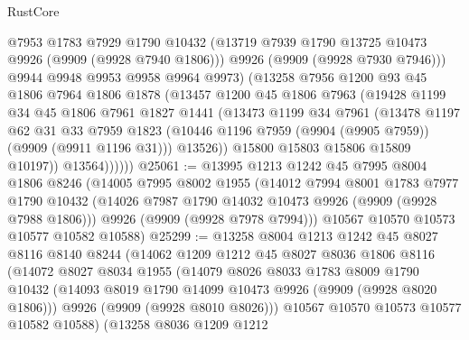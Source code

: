 \begin{lexlean}{RustCore}
\begin{coremodule}
                  @7953
                  @1783
                  @7929
                  @1790
                  @10432
                  (@13719 @7939 @1790 @13725 @10473 @9926 (@9909 (@9928 @7940 @1806)))
                  @9926
                  (@9909 (@9928 @7930 @7946)))
                @9944
                @9948
                @9953
                @9958
                @9964
                @9973)
              (@13258
                @7956
                @1200
                @93
                @45
                @1806
                @7964
                @1806
                @1878
                (@13457
                  @1200
                  @45
                  @1806
                  @7963
                  (@19428
                    @1199
                    @34
                    @45
                    @1806
                    @7961
                    @1827
                    @1441
                    (@13473
                      @1199
                      @34
                      @7961
                      (@13478
                        @1197
                        @62
                        @31
                        @33
                        @7959
                        @1823
                        (@10446 @1196 @7959 (@9904 (@9905 @7959)) (@9909 (@9911 @1196 @31)))
                        @13526))
                    @15800
                    @15803
                    @15806
                    @15809
                    @10197))
                @13564))))))
@25061 := @13995
    @1213
    @1242
    @45
    @7995
    @8004
    @1806
    @8246
    (@14005
      @7995
      @8002
      @1955
      (@14012
        @7994
        @8001
        @1783
        @7977
        @1790
        @10432
        (@14026 @7987 @1790 @14032 @10473 @9926 (@9909 (@9928 @7988 @1806)))
        @9926
        (@9909 (@9928 @7978 @7994)))
      @10567
      @10570
      @10573
      @10577
      @10582
      @10588)
@25299 := @13258
    @8004
    @1213
    @1242
    @45
    @8027
    @8116
    @8140
    @8244
    (@14062
      @1209
      @1212
      @45
      @8027
      @8036
      @1806
      @8116
      (@14072
        @8027
        @8034
        @1955
        (@14079
          @8026
          @8033
          @1783
          @8009
          @1790
          @10432
          (@14093 @8019 @1790 @14099 @10473 @9926 (@9909 (@9928 @8020 @1806)))
          @9926
          (@9909 (@9928 @8010 @8026)))
        @10567
        @10570
        @10573
        @10577
        @10582
        @10588)
      (@13258
        @8036
        @1209
        @1212

\end{coremodule}
\end{lexlean}
